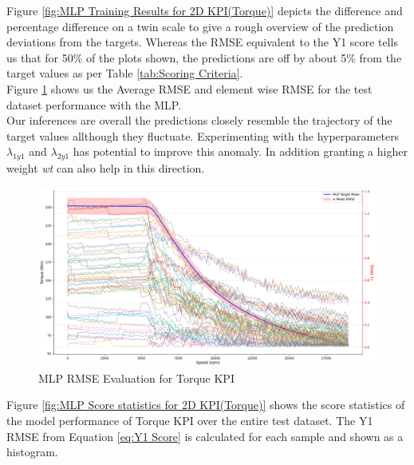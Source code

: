 \documentclass{report} %
\begin{document}
Figure \ref{fig:MLP Training Results for 2D KPI(Torque)} depicts the difference and percentage difference on a twin scale to give a rough overview of the prediction deviations from the targets.
Whereas the \ac{RMSE} equivalent to the Y1 score tells us that for 50\% of the plots shown, the predictions are off by about 5\% from the target values as per Table \ref{tab:Scoring Criteria}.\\
Figure \ref{fig:MLP RMSE Evaluation for 2D KPI(Torque)} shows us the Average \ac{RMSE} and element wise \ac{RMSE} for the test dataset performance with the \ac{MLP}. \\
Our inferences are overall the predictions closely resemble the trajectory of the target values allthough they fluctuate.
Experimenting with the hyperparameters \textit{$\lambda_{1y1}$} and \textit{$\lambda_{2y1}$} has potential to improve this anomaly. 
In addition granting a higher weight \textit{wt} can also help in this direction.\\
\begin{figure}[H]
    \centering
    \includegraphics[width=1\textwidth]{./ReportImages/RMSE_MLP_y1.png} 
    \caption{\ac{MLP} \ac{RMSE} Evaluation for Torque \ac{KPI}} 
    \label{fig:MLP RMSE Evaluation for 2D KPI(Torque)}
\end{figure}


Figure \ref{fig:MLP Score statistics for 2D KPI(Torque)} shows the score statistics of the model performance of Torque \ac{KPI} over the entire test dataset.
The Y1 \ac{RMSE} from Equation \ref{eq:Y1 Score} is calculated for each sample and shown as a histogram.\\
\end{document}
